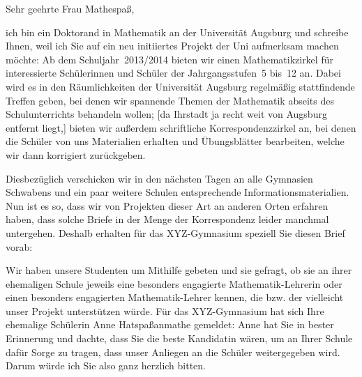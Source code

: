 \documentclass{zirkelbrief}
\begin{document}
\renewcommand{\anschrift}{%
      Holbein-Gymnasium Augsburg \\
      Fachbereich Mathematik \\
      Hallstraße 10 \\
      86150 Augsburg}
\renewcommand{\datum}{\today}
\renewcommand{\betreff}{Matheschülerzirkel der Universität Augsburg}
\renewcommand{\absender}{%
      \textbf{Ingo Blechschmidt} \\
      \ \\
      Lehrstuhl für Algebra und Zahlentheorie \\
      Universitätsstr. 14 \\
      86159 Augsburg \\
      \ \\
      Telefon \> +49 (0) 821 598 -- 5601 \\
      Telefax \> +49 (0) 821 598 -- 2090 \\
      \textsf{blechschmidt@math.uni-augsburg.de} \\}

\makeletterhead

Sehr geehrte Frau Mathespaß,

ich bin ein Doktorand in Mathematik an der Universität Augsburg und schreibe
Ihnen, weil ich Sie auf ein neu initiiertes Projekt der Uni aufmerksam machen
möchte: Ab dem Schuljahr~2013/2014 bieten wir einen Mathematikzirkel für
interessierte Schülerinnen und Schüler der Jahrgangsstufen~5 bis~12 an. Dabei
wird es in den Räumlichkeiten der Universität Augsburg regelmäßig stattfindende
Treffen geben, bei denen wir spannende Themen der Mathematik abseits des
Schulunterrichts behandeln wollen; [da Ihrstadt ja recht weit von Augsburg
entfernt liegt,] bieten wir außerdem schriftliche Korrespondenzzirkel an, bei
denen die Schüler von uns Materialien erhalten und Übungsblätter bearbeiten,
welche wir dann korrigiert zurückgeben.

Diesbezüglich verschicken wir in den nächsten Tagen an alle Gymnasien Schwabens
und ein paar weitere Schulen entsprechende Informationsmaterialien. Nun ist es
so, dass wir von Projekten dieser Art an anderen Orten erfahren haben, dass
solche Briefe in der Menge der Korrespondenz leider manchmal untergehen.
Deshalb erhalten für das XYZ-Gymnasium speziell Sie diesen Brief vorab:

Wir haben unsere Studenten um Mithilfe gebeten und sie gefragt, ob sie an ihrer
ehemaligen Schule jeweils eine besonders engagierte Mathematik-Lehrerin oder einen besonders
engagierten Mathematik-Lehrer kennen, die bzw. der
vielleicht unser Projekt unterstützen würde. Für das XYZ-Gymnasium hat sich
Ihre ehemalige Schülerin Anne Hatspaßanmathe gemeldet: Anne hat Sie in bester
Erinnerung und dachte, dass Sie die beste Kandidatin wären, um an Ihrer Schule
dafür Sorge zu tragen, dass unser Anliegen an die Schüler
weitergegeben wird. Darum würde ich Sie also ganz herzlich bitten.
\end{document}

